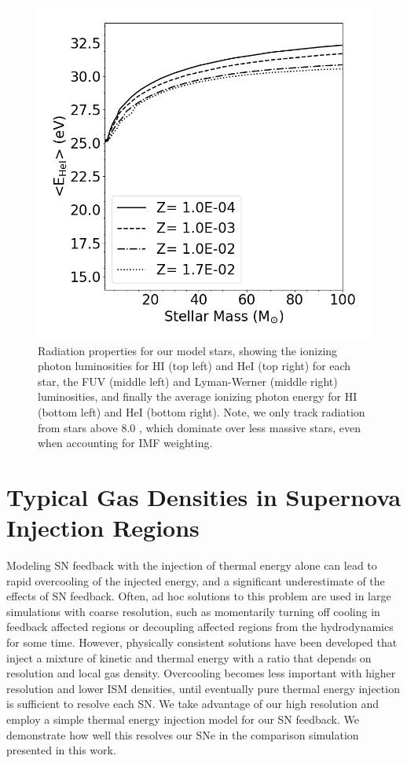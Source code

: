 \begin{figure}
\includegraphics[width=0.4\linewidth]{figures/ch1/E1}
\caption{Radiation properties for our model stars, showing the ionizing photon luminosities for HI (top left) and HeI (top right) for each star, the FUV (middle left) and Lyman-Werner (middle right) luminosities, and finally the average ionizing photon energy for HI (bottom left) and HeI (bottom right). Note, we only track radiation from stars above 8.0 \msun, which dominate over less massive stars, even when accounting for IMF weighting.}
\label{ch1:fig:stellar radiation properties}
\end{figure}

\setcounter{figure}{0}
\section{Typical Gas Densities in Supernova Injection Regions}
\label{appendix:SN}

Modeling SN feedback with the injection of thermal energy alone can lead to rapid overcooling of the injected energy, and a significant underestimate of the effects of SN feedback. Often, ad hoc solutions to this problem are used in large simulations with coarse resolution, such as momentarily turning off cooling in feedback affected regions or decoupling affected regions from the hydrodynamics for some time. However, physically consistent solutions have been developed \citep[e.g][]{Simpson2016} that inject a mixture of kinetic and thermal energy with a ratio that depends on resolution and local gas density. Overcooling becomes less important with higher resolution and lower ISM densities, until eventually pure thermal energy injection is sufficient to resolve each SN. We take advantage of our high resolution and employ a simple thermal energy injection model for our SN feedback. We demonstrate how well this resolves our SNe in the comparison simulation presented in this work.

